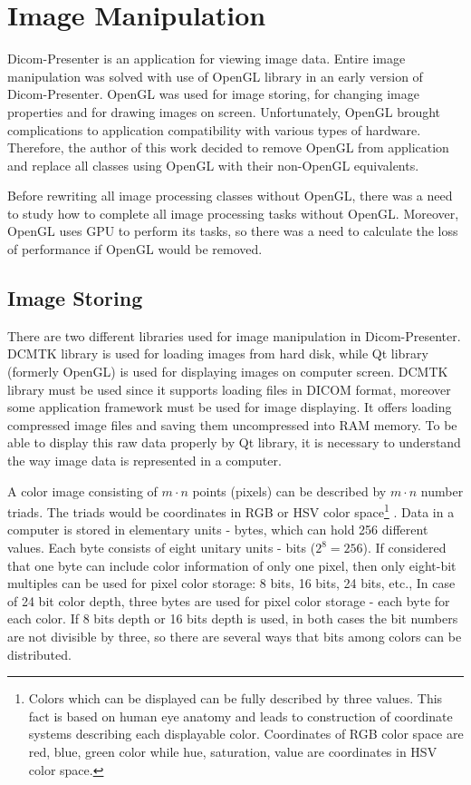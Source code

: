 \chapter{Image Manipulation}
\vspace{-10mm}

Dicom-Presenter is an application for viewing image data. Entire image manipulation was solved with use of OpenGL library in an early version of Dicom-Presenter. OpenGL was used for image storing, for changing image properties and for drawing images on screen. Unfortunately, OpenGL brought complications to application compatibility with various types of hardware. Therefore, the author of this work decided to remove OpenGL from application and replace all classes using OpenGL with their non-OpenGL equivalents. 

Before rewriting all image processing classes without OpenGL, there was a need to study how to complete all image processing tasks without OpenGL. Moreover, OpenGL uses GPU to perform its tasks, so there was a need to calculate the loss of performance if OpenGL would be removed. 

\section{Image Storing}
\label{rawdata}
There are two different libraries used for image manipulation in Dicom-Presenter. DCMTK library is used for loading images from hard disk, while Qt library (formerly OpenGL) is used for displaying images on computer screen. DCMTK library must be used since it supports loading files in DICOM format, moreover some application framework must be used for image displaying. It offers loading compressed image files and saving them uncompressed into RAM memory. To be able to display this raw data properly by Qt library, it is necessary to understand the way image data is represented in a computer. 

A color image consisting of $m \cdot n$ points (pixels) can be described by $m \cdot n$ number triads. The triads would be coordinates in RGB or HSV color space\footnote{Colors which can be displayed can be fully described by three values. This fact is based on human eye anatomy and leads to construction of coordinate systems describing each displayable color. Coordinates of RGB color space are red, blue, green color while hue, saturation, value are coordinates in HSV color space.} \cite{digitalimageprocessing}. Data in a computer is stored in elementary units - bytes, which can hold 256 different values. Each byte consists of eight unitary units - bits ($2^8 = 256 $). If considered that one byte can include color information of only one pixel, then only eight-bit multiples can be used for pixel color storage: 8 bits, 16 bits, 24 bits, etc.\cite{compressionfordigitalvideo},\cite{nutshell} In case of 24 bit color depth, three bytes are used for pixel color storage - each byte for each color. If 8 bits depth or 16 bits depth is used, in both cases the bit numbers are not divisible by three, so there are several ways that bits among colors can be distributed.
 
